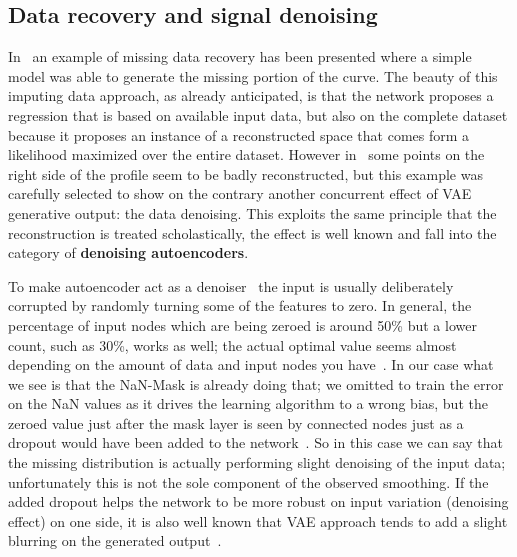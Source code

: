 \subsection{Data recovery and signal denoising}
\label{section:recovery}
In~\Figure{\ref{fig:missing data example}} an example of missing data recovery has been presented where a simple  model was able to generate the missing portion of the curve. The beauty of this imputing data approach, as already anticipated, is that the network proposes a regression that is based on available input data, but also on the complete dataset because it proposes an instance of a reconstructed space that comes form a likelihood maximized over the entire dataset.
However in~\Figure{\ref{fig:missing recovery_a}} some points on the right side of the profile seem to be badly reconstructed, but this example was carefully selected to show on the contrary another concurrent effect of \acs{VAE} generative output: the data denoising.
This exploits the same principle that the reconstruction is treated scholastically, the effect is well known and fall into the category of \textbf{denoising autoencoders}.

To make autoencoder act as a denoiser~\cite{vincent_et_al_denoise2008} the input is usually deliberately corrupted by randomly turning some of the features to zero. In general, the percentage of input nodes which are being zeroed is around 50\% but a lower count, such as 30\%, works as well; the actual optimal value seems almost depending on the amount of data and input nodes you have~\cite{ae_denoise}. In our case what we see is that the NaN-Mask is already doing that; we omitted to train the error on the NaN values as it drives the learning algorithm to a wrong bias, but the zeroed value just after the mask layer is seen by connected nodes just as a dropout would have been added to the network~\cite{Srivastava:2014:DSW:2627435.2670313}. So in this case we can say that the missing distribution is actually performing slight denoising of the input data; unfortunately this is not the sole component of the observed smoothing. If the added dropout helps the network to be more robust on input variation (denoising effect) on one side, it is also well known that VAE approach tends to add a slight blurring on the generated output~\cite{ghosh2019variational}. 

